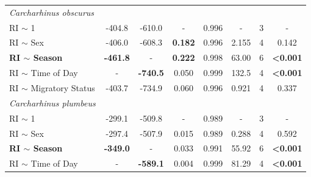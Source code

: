 \documentclass[11pt,a4paper]{article}
\begin{document}
\begin{table}[h!]
\begin{tabular}{lccccccc}
			\hline
			\textit{Carcharhinus obscurus} &             &             &                         &                         &                        &             &                 \\
			RI $\sim$ 1                     & -404.8      & -610.0      & -                       & 0.996                   & -                      & 3           & -               \\
			RI $\sim$ Sex                   & -406.0      & -608.3      & \textbf{0.182}                   & 0.996                   & 2.155                  & 4           & 0.142           \\
			\textbf{RI $\sim$ Season}                & \textbf{-461.8}      & -           & \textbf{0.222}                   & 0.998                   & 63.00                  & 6           & \textbf{\textless 0.001 }\\
			RI $\sim$ Time of Day           & -           & \textbf{-740.5}      & 0.050                   & 0.999                   & 132.5                  & 4           & \textbf{\textless 0.001} \\
			RI $\sim$ Migratory Status      & -403.7      & -734.9      & 0.060                   & 0.996                   & 0.921                  & 4           & 0.337           \\
			\hline
			\textit{Carcharhinus plumbeus} &             &             &                         &                         &                        &             &                 \\
			RI $\sim$ 1                     & -299.1      & -509.8      & -                       & 0.989                   & -                      & 3           & -               \\
			RI $\sim$ Sex                   & -297.4      & -507.9      & 0.015                   & 0.989                   & 0.288                  & 4           & 0.592           \\
			\textbf{RI $\sim$ Season}                & \textbf{-349.0}      & -           & 0.033                   & 0.991                   & 55.92                  & 6           & \textbf{\textless 0.001} \\
			RI $\sim$ Time of Day           & -           & \textbf{-589.1}      & 0.004                   & 0.999                   & 81.29                  & 4           & \textbf{\textless 0.001} \\
			\hline
		\end{tabular}
		\label{ri_outputs}
	\end{table}
	
\end{document}
